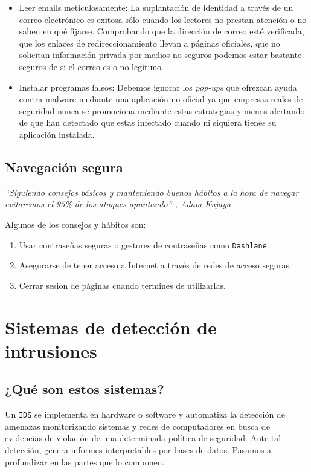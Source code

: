\documentclass[12pt]{article}
\newcommand{\newpar} {
    \vskip 0.5cm
}
\begin{document}
            \begin{itemize}
                \item Leer emails meticulosamente: La suplantación de identidad a través de un correo electrónico es exitosa sólo cuando los lectores no prestan atención o no saben en qué fijarse. Comprobando que la dirección de correo esté verificada, que los enlaces de redireccionamiento llevan a páginas oficiales, que no solicitan información privada por medios no seguros podemos estar bastante seguros de si el correo es o no legítimo.
                \item Instalar programas falsos: Debemos ignorar los \textit{pop-ups} que ofrezcan ayuda contra malware mediante una aplicación no oficial ya que empresas reales de seguridad nunca se promociona mediante estas estrategias y menos alertando de que han detectado que estas infectado cuando ni siquiera tienes su aplicación instalada.
            \end{itemize}

        \subsection{Navegación segura}
            \textit{“Siguiendo consejos básicos y manteniendo buenos hábitos a la hora de navegar evitaremos el 95\% de los ataques apuntando” , Adam Kujaya}

            \newpar

            Algunos de los consejos y hábitos son:

            \begin{enumerate}
                \item Usar contraseñas seguras o gestores de contraseñas como \texttt{Dashlane}.
                \item Asegurarse de tener acceso a Internet a través de redes de acceso seguras.
                \item Cerrar sesion de páginas cuando termines de utilizarlas.
            \end{enumerate}

    \section{Sistemas de detección de intrusiones}
        \subsection{¿Qué son estos sistemas?}
            Un \texttt{IDS} se implementa en hardware o software y automatiza la detección de amenazas monitorizando sistemas y redes de computadores en busca de evidencias de violación de una determinada política de seguridad. Ante tal detección, genera informes interpretables por bases de datos. Pasamos a profundizar en las partes que lo componen.
\end{document}
